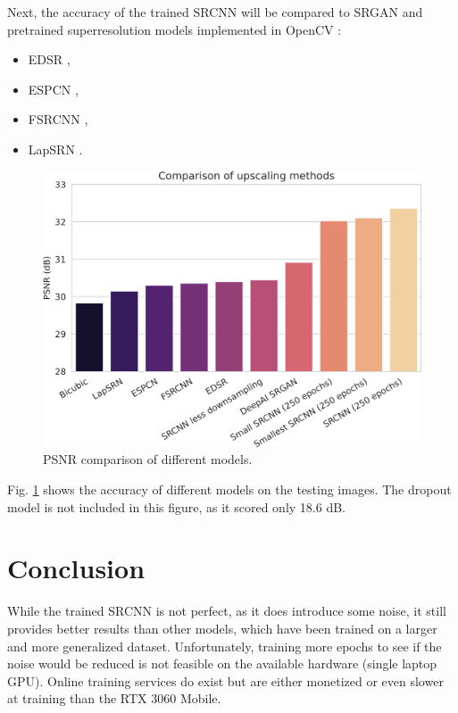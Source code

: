\documentclass[english]{mvi-report}
\begin{document}
Next, the accuracy of the trained SRCNN will be compared to SRGAN \cite{Ledig2016} and pretrained superresolution models implemented in OpenCV \cite{OpenCV}:
\begin{itemize}
  \item EDSR \cite{Lim2017},
  \item ESPCN \cite{Shi2016},
  \item FSRCNN \cite{Dong2016},
  \item LapSRN \cite{Lai2017}.
\end{itemize}

\begin{figure}[htpb]
  \centering
  \includegraphics[width=\linewidth]{media/PSNR-comparison.png}
  \caption{PSNR comparison of different models.}
  \label{fig:psnr-comparison}
\end{figure}

Fig. \ref{fig:psnr-comparison} shows the accuracy of different models on the testing images. The dropout model is not included in this figure, as it scored only 18.6 dB.

\section{Conclusion}

While the trained SRCNN is not perfect, as it does introduce some noise, it still provides better results than other models, which have been trained on a larger and more generalized dataset. Unfortunately, training more epochs to see if the noise would be reduced is not feasible on the available hardware (single laptop GPU). Online training services do exist but are either monetized or even slower at training than the RTX 3060 Mobile.
\end{document}
